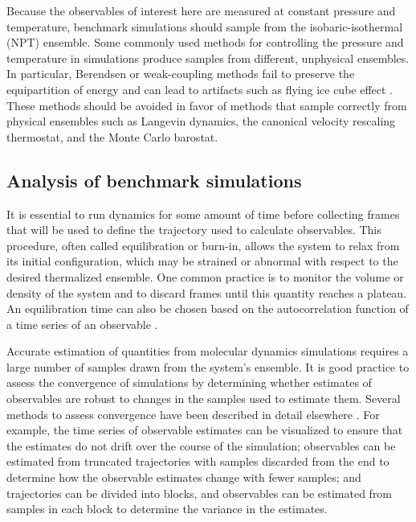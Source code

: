 \documentclass[9pt,review]{livecoms}
\begin{document}
Because the observables of interest here are measured at constant pressure and temperature, benchmark simulations should sample from the isobaric-isothermal (NPT) ensemble.
Some commonly used methods for controlling the pressure and temperature in simulations produce samples from different, unphysical ensembles.
In particular, Berendsen or weak-coupling methods fail to preserve the equipartition of energy and can lead to artifacts such as flying ice cube effect \cite{harvey_flying_1998,braun_anomalous_2018}.
These methods should be avoided in favor of methods that sample correctly from physical ensembles such as Langevin dynamics, the canonical velocity rescaling thermostat, and the Monte Carlo barostat.

\subsection{Analysis of benchmark simulations}
\label{sub:best_practices_analysis}

It is essential to run dynamics for some amount of time before collecting frames that will be used to define the trajectory used to calculate observables.
This procedure, often called equilibration or burn-in, allows the system to relax from its initial configuration, which may be strained or abnormal with respect to the desired thermalized ensemble.
One common practice is to monitor the volume or density of the system and to discard frames until this quantity reaches a plateau.
An equilibration time can also be chosen based on the autocorrelation function of a time series of an observable \cite{chodera_simple_2016}.

Accurate estimation of quantities from molecular dynamics simulations requires a large number of samples drawn from the system's ensemble.
It is good practice to assess the convergence of simulations by determining whether estimates of observables are robust to changes in the samples used to estimate them.
Several methods to assess convergence have been described in detail elsewhere \cite{grossfield_best_2019}.
For example, the time series of observable estimates can be visualized to ensure that the estimates do not drift over the course of the simulation; 
observables can be estimated from truncated trajectories with samples discarded from the end to determine how the observable estimates change with fewer samples;
and trajectories can be divided into blocks, and observables can be estimated from samples in each block to determine the variance in the estimates.
\end{document}
